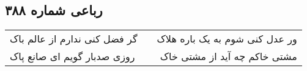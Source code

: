 \begin{center}
\section*{رباعی شماره ۳۸۸}
\label{sec:sh388}
\begin{longtable}{l p{0.5cm} r}
گر فضل کنی ندارم از عالم باک
&&
ور عدل کنی شوم به یک باره هلاک
\\
روزی صدبار گویم ای صانع پاک
&&
مشتی خاکم چه آید از مشتی خاک
\\
\end{longtable}
\end{center}
